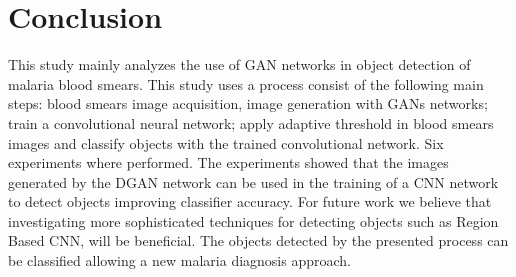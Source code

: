 \section{Conclusion}


This study mainly analyzes the use of GAN networks in object detection of malaria blood smears. This study uses a process consist of the following main steps: blood smears image acquisition, image generation with GANs networks; train a convolutional neural network;  apply adaptive  threshold in blood smears images and classify objects with the trained convolutional network. Six experiments where performed. The experiments showed that the images generated by the DGAN network can be used in the training of a CNN network to detect objects improving classifier accuracy. For future work we believe that investigating more sophisticated techniques for detecting objects such as Region Based CNN, will be beneficial. The objects detected by the presented process can be classified allowing a new malaria diagnosis approach.